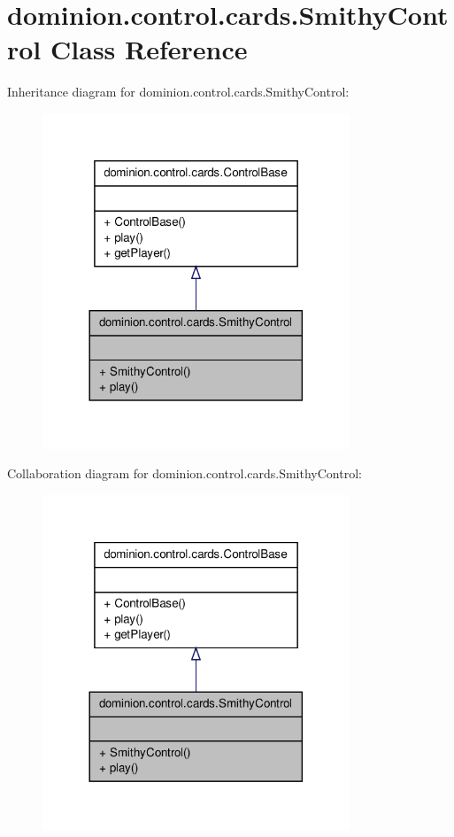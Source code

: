 \hypertarget{classdominion_1_1control_1_1cards_1_1SmithyControl}{\section{dominion.\-control.\-cards.\-Smithy\-Control \-Class \-Reference}
\label{classdominion_1_1control_1_1cards_1_1SmithyControl}
}


\-Inheritance diagram for dominion.\-control.\-cards.\-Smithy\-Control\-:
\nopagebreak
\begin{figure}[H]
\begin{center}
\leavevmode
\includegraphics[width=260pt]{classdominion_1_1control_1_1cards_1_1SmithyControl__inherit__graph}
\end{center}
\end{figure}


\-Collaboration diagram for dominion.\-control.\-cards.\-Smithy\-Control\-:
\nopagebreak
\begin{figure}[H]
\begin{center}
\leavevmode
\includegraphics[width=260pt]{classdominion_1_1control_1_1cards_1_1SmithyControl__coll__graph}
\end{center}
\end{figure}
